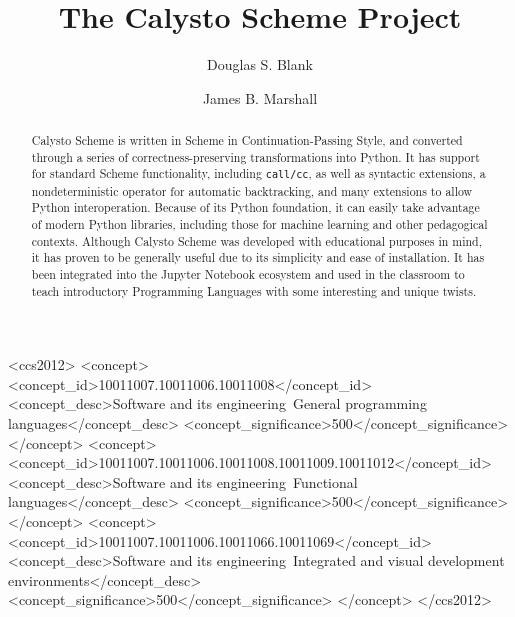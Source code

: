 \documentclass[acmsmall,screen,authorversion]{acmart}
\begin{document}
\title[Calysto Scheme]{The Calysto Scheme Project}

\author{Douglas S. Blank}

\author{James B. Marshall}

\renewcommand{\shortauthors}{D. S. Blank and J. B. Marshall}

\begin{abstract}
Calysto Scheme is written in Scheme in Continuation-Passing Style, and
converted through a series of correctness-preserving transformations into
Python. It has support for standard Scheme functionality, including
\texttt{call/cc}, as well as syntactic extensions, a nondeterministic operator
for automatic backtracking, and many extensions to allow Python
interoperation. Because of its Python foundation, it can easily take advantage
of modern Python libraries, including those for machine learning and other
pedagogical contexts. Although Calysto Scheme was developed with educational
purposes in mind, it has proven to be generally useful due to its simplicity
and ease of installation. It has been integrated into the Jupyter Notebook
ecosystem and used in the classroom to teach introductory Programming Languages
with some interesting and unique twists.
\end{abstract}

\begin{CCSXML}
<ccs2012>
<concept>
<concept_id>10011007.10011006.10011008</concept_id>
<concept_desc>Software and its engineering~General programming languages</concept_desc>
<concept_significance>500</concept_significance>
</concept>
<concept>
<concept_id>10011007.10011006.10011008.10011009.10011012</concept_id>
<concept_desc>Software and its engineering~Functional languages</concept_desc>
<concept_significance>500</concept_significance>
</concept>
<concept>
<concept_id>10011007.10011006.10011066.10011069</concept_id>
<concept_desc>Software and its engineering~Integrated and visual development environments</concept_desc>
<concept_significance>500</concept_significance>
</concept>
</ccs2012>
\end{CCSXML}
\end{document}
